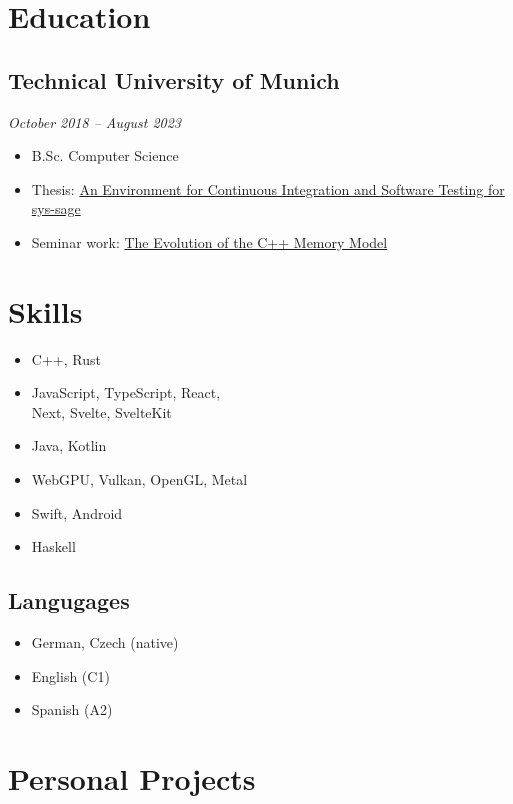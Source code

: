 \documentclass{article}
\begin{document}
\begin{paracol}{2}
\section{Education}

\subsection{Technical University of Munich}
{\itshape October 2018 -- August 2023}

\begin{itemize}
\setlength\itemsep{0em}
\item B.Sc. Computer Science
\item Thesis: \href{https://jimec.dev/Thesis.pdf}{An Environment for Continuous Integration and Software Testing for sys-sage}
\item Seminar work: \href{https://jimec.dev/C++%20Memory%20Model.pdf}{The Evolution of the C++ Memory Model}
\end{itemize}

\syncallcounters
\switchcolumn

\section{Skills}

\begin{itemize}
\setlength\itemsep{0em}
\item C++, Rust
\item JavaScript, TypeScript, React, \\Next, Svelte, SvelteKit
\item Java, Kotlin
\item WebGPU, Vulkan, OpenGL, Metal
\item Swift, Android
\item Haskell
\end{itemize}

\subsection{Langugages}

\begin{itemize}
\setlength\itemsep{0em}
\item German, Czech (native)
\item English (C1)
\item Spanish (A2)
\end{itemize}

\section{Personal Projects}


\end{paracol}
\end{document}
